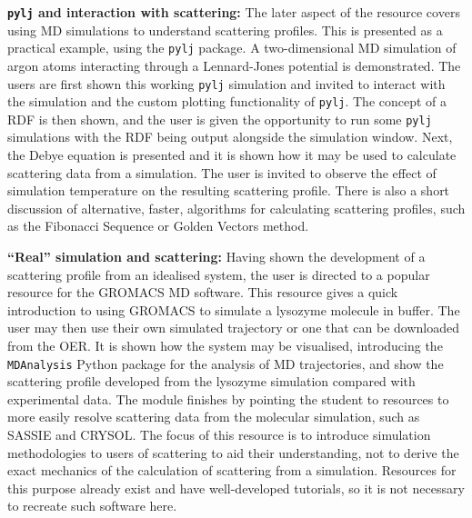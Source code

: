 \textbf{\texttt{pylj} and interaction with scattering:} The later aspect of the resource covers using MD simulations to understand scattering profiles.
This is presented as a practical example, using the \texttt{pylj} package.\autocite{mccluskey_pylj_2018,mccluskey_arm61/pylj_2019-2}
A two-dimensional MD simulation of argon atoms interacting through a Lennard-Jones potential is demonstrated.
The users are first shown this working \texttt{pylj} simulation and invited to interact with the simulation and the custom plotting functionality of \texttt{pylj}.
The concept of a RDF is then shown, and the user is given the opportunity to run some \texttt{pylj} simulations with the RDF being output alongside the simulation window.
Next, the Debye equation\autocite{debye_zerstreuung_1915} is presented and it is shown how it may be used to calculate scattering data from a simulation.
The user is invited to observe the effect of simulation temperature on the resulting scattering profile.
There is also a short discussion of alternative, faster, algorithms for calculating scattering profiles, such as the Fibonacci Sequence or Golden Vectors method.\autocite{watson_rapid_2013,svergun_solution_1994}

\textbf{``Real'' simulation and scattering:} Having shown the development of a scattering profile from an idealised system, the user is directed to a popular resource for the GROMACS\autocite{berendsen_gromacs_1995} MD software.
This resource gives a quick introduction to using GROMACS to simulate a lysozyme molecule in buffer.\autocite{lemkul_gromacs_nodate}
The user may then use their own simulated trajectory or one that can be downloaded from the OER.
It is shown how the system may be visualised, introducing the \texttt{MDAnalysis} Python package for the analysis of MD trajectories,\autocite{michaud-agrawal_mdanalysis_2011,gowers_mdanalysis_2016} and show the scattering profile developed from the lysozyme simulation compared with experimental data.\autocite{franke_correlation_2015}
The module finishes by pointing the student to resources to more easily resolve scattering data from the molecular simulation, such as SASSIE and CRYSOL.\autocite{perkins_atomistic_2016,svergun_crysol_1995}
The focus of this resource is to introduce simulation methodologies to users of scattering to aid their understanding, not to derive the exact mechanics of the calculation of scattering from a simulation.
Resources for this purpose already exist and have well-developed tutorials, so it is not necessary to recreate such software here.
